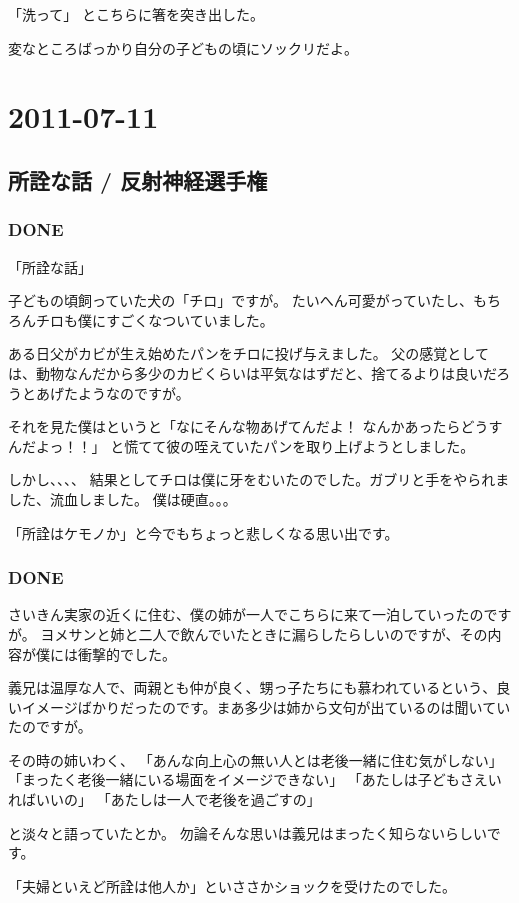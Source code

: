 \documentclass[11pt]{article}
\begin{document}
「洗って」
とこちらに箸を突き出した。

変なところばっかり自分の子どもの頃にソックリだよ。
\section{2011-07-11}
\label{sec-97}
\subsection{所詮な話 / 反射神経選手権}
\label{sec-97_1}
\subsubsection{\textbf{DONE}}
\label{sec-97_1_1}

「所詮な話」

子どもの頃飼っていた犬の「チロ」ですが。
たいへん可愛がっていたし、もちろんチロも僕にすごくなついていました。

ある日父がカビが生え始めたパンをチロに投げ与えました。
父の感覚としては、動物なんだから多少のカビくらいは平気なはずだと、捨てるよりは良いだろうとあげたようなのですが。

それを見た僕はというと「なにそんな物あげてんだよ！ なんかあったらどうすんだよっ！！」
と慌てて彼の咥えていたパンを取り上げようとしました。

しかし、、、、
結果としてチロは僕に牙をむいたのでした。ガブリと手をやられました、流血しました。
僕は硬直。。。

「所詮はケモノか」と今でもちょっと悲しくなる思い出です。
\subsubsection{\textbf{DONE}}
\label{sec-97_1_2}

さいきん実家の近くに住む、僕の姉が一人でこちらに来て一泊していったのですが。
ヨメサンと姉と二人で飲んでいたときに漏らしたらしいのですが、その内容が僕には衝撃的でした。

義兄は温厚な人で、両親とも仲が良く、甥っ子たちにも慕われているという、良いイメージばかりだったのです。まあ多少は姉から文句が出ているのは聞いていたのですが。

その時の姉いわく、
「あんな向上心の無い人とは老後一緒に住む気がしない」
「まったく老後一緒にいる場面をイメージできない」
「あたしは子どもさえいればいいの」
「あたしは一人で老後を過ごすの」

と淡々と語っていたとか。
勿論そんな思いは義兄はまったく知らないらしいです。

「夫婦といえど所詮は他人か」といささかショックを受けたのでした。
\end{document}
